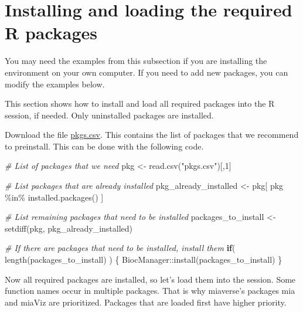 \documentclass[
  oneside]{book}
\newenvironment{Shaded}{\begin{snugshade}}{\end{snugshade}}
\newcommand{\CommentTok}[1]{\textcolor[rgb]{0.56,0.35,0.01}{\textit{#1}}}
\newcommand{\ControlFlowTok}[1]{\textcolor[rgb]{0.13,0.29,0.53}{\textbf{#1}}}
\newcommand{\DecValTok}[1]{\textcolor[rgb]{0.00,0.00,0.81}{#1}}
\newcommand{\FunctionTok}[1]{\textcolor[rgb]{0.00,0.00,0.00}{#1}}
\newcommand{\NormalTok}[1]{#1}
\newcommand{\OtherTok}[1]{\textcolor[rgb]{0.56,0.35,0.01}{#1}}
\newcommand{\SpecialCharTok}[1]{\textcolor[rgb]{0.00,0.00,0.00}{#1}}
\newcommand{\StringTok}[1]{\textcolor[rgb]{0.31,0.60,0.02}{#1}}
\begin{document}
\hypertarget{packages}{%
\section{Installing and loading the required R packages}\label{packages}}

You may need the examples from this subsection if you are installing
the environment on your own computer. If you need to add new packages,
you can modify the examples below.

This section shows how to install and load all required packages into
the R session, if needed. Only uninstalled packages are installed.

Download the file \url{pkgs.csv}. This contains the list of
packages that we recommend to preinstall. This can be done with the
following code.

\begin{Shaded}
\begin{Highlighting}[]
\CommentTok{\# List of packages that we need}
\NormalTok{pkg }\OtherTok{\textless{}{-}} \FunctionTok{read.csv}\NormalTok{(}\StringTok{"pkgs.csv"}\NormalTok{)[,}\DecValTok{1}\NormalTok{]}

\CommentTok{\# List packages that are already installed}
\NormalTok{pkg\_already\_installed }\OtherTok{\textless{}{-}}\NormalTok{ pkg[ pkg }\SpecialCharTok{\%in\%} \FunctionTok{installed.packages}\NormalTok{() ]}

\CommentTok{\# List remaining packages that need to be installed}
\NormalTok{packages\_to\_install }\OtherTok{\textless{}{-}} \FunctionTok{setdiff}\NormalTok{(pkg, pkg\_already\_installed)}
\end{Highlighting}
\end{Shaded}

\begin{Shaded}
\begin{Highlighting}[]
\CommentTok{\# If there are packages that need to be installed, install them }
\ControlFlowTok{if}\NormalTok{( }\FunctionTok{length}\NormalTok{(packages\_to\_install) ) \{}
\NormalTok{   BiocManager}\SpecialCharTok{::}\FunctionTok{install}\NormalTok{(packages\_to\_install)}
\NormalTok{\}}
\end{Highlighting}
\end{Shaded}

Now all required packages are installed, so let's load them into the session.
Some function names occur in multiple packages. That is why miaverse's packages
mia and miaViz are prioritized. Packages that are loaded first have higher priority.
\end{document}

